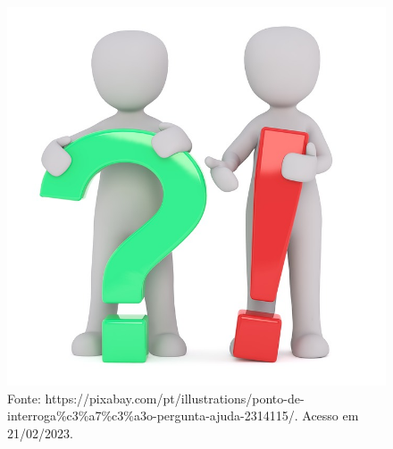 \begin{figure}[htpb!]
\includegraphics[width=.5\textwidth]{./imgs/img7.jpg}
\caption{Fonte: https://pixabay.com/pt/illustrations/ponto-de-interroga\%c3\%a7\%c3\%a3o-pergunta-ajuda-2314115/. Acesso em 21/02/2023.}
\end{figure}

